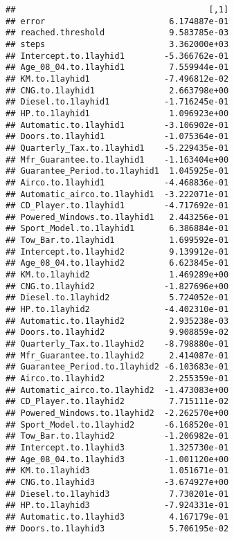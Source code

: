 \documentclass[
]{article}
\newenvironment{Shaded}{\begin{snugshade}}{\end{snugshade}}
\newcommand{\FunctionTok}[1]{\textcolor[rgb]{0.00,0.00,0.00}{#1}}
\newcommand{\NormalTok}[1]{#1}
\newcommand{\OtherTok}[1]{\textcolor[rgb]{0.56,0.35,0.01}{#1}}
\newcommand{\SpecialCharTok}[1]{\textcolor[rgb]{0.00,0.00,0.00}{#1}}
\begin{document}
\begin{Shaded}
\end{Shaded}

\begin{verbatim}
##                                       [,1]
## error                         6.174887e-01
## reached.threshold             9.583785e-03
## steps                         3.362000e+03
## Intercept.to.1layhid1        -5.366762e-01
## Age_08_04.to.1layhid1         7.559944e-01
## KM.to.1layhid1               -7.496812e-02
## CNG.to.1layhid1               2.663798e+00
## Diesel.to.1layhid1           -1.716245e-01
## HP.to.1layhid1                1.096923e+00
## Automatic.to.1layhid1        -3.106902e-01
## Doors.to.1layhid1            -1.075364e-01
## Quarterly_Tax.to.1layhid1    -5.229435e-01
## Mfr_Guarantee.to.1layhid1    -1.163404e+00
## Guarantee_Period.to.1layhid1  1.045925e-01
## Airco.to.1layhid1            -4.468836e-01
## Automatic_airco.to.1layhid1  -3.222071e-01
## CD_Player.to.1layhid1        -4.717692e-01
## Powered_Windows.to.1layhid1   2.443256e-01
## Sport_Model.to.1layhid1       6.386884e-01
## Tow_Bar.to.1layhid1           1.699592e-01
## Intercept.to.1layhid2         9.139912e-01
## Age_08_04.to.1layhid2         6.623845e-01
## KM.to.1layhid2                1.469289e+00
## CNG.to.1layhid2              -1.827696e+00
## Diesel.to.1layhid2            5.724052e-01
## HP.to.1layhid2               -4.402310e-01
## Automatic.to.1layhid2         2.935238e-03
## Doors.to.1layhid2             9.908859e-02
## Quarterly_Tax.to.1layhid2    -8.798880e-01
## Mfr_Guarantee.to.1layhid2     2.414087e-01
## Guarantee_Period.to.1layhid2 -6.103683e-01
## Airco.to.1layhid2             2.255359e-01
## Automatic_airco.to.1layhid2  -1.473083e+00
## CD_Player.to.1layhid2         7.715111e-02
## Powered_Windows.to.1layhid2  -2.262570e+00
## Sport_Model.to.1layhid2      -6.168520e-01
## Tow_Bar.to.1layhid2          -1.206982e-01
## Intercept.to.1layhid3         1.325730e-01
## Age_08_04.to.1layhid3        -1.001120e+00
## KM.to.1layhid3                1.051671e-01
## CNG.to.1layhid3              -3.674927e+00
## Diesel.to.1layhid3            7.730201e-01
## HP.to.1layhid3               -7.924331e-01
## Automatic.to.1layhid3         4.167179e-01
## Doors.to.1layhid3             5.706195e-02

\end{verbatim}
\end{document}
